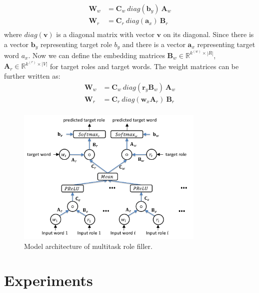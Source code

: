 \documentclass[a4paper]{article}
\begin{document}
\begin{equation} \label{eq:cls}
\begin{aligned}
    \mathbf{W}_w
        &= \mathbf{C}_w \ diag(\mathbf{b}_y) \ \mathbf{A}_w \\
    \mathbf{W}_r
        &= \mathbf{C}_r \ diag(\mathbf{a}_x) \ \mathbf{B}_r \\
\end{aligned}
\end{equation}
where $diag(\mathbf{v})$ is a diagonal matrix with vector $\mathbf{v}$ on its diagonal. Since there is a vector $\mathbf{b}_y$ representing target role $b_y$ and there is a vector $\mathbf{a}_x$ representing target word $a_x$. Now we can define the embedding matrices $\mathbf{B}_w \in \mathbb{R}^{k^{(w)} \times |R|}$, $\mathbf{A}_r \in \mathbb{R}^{k^{(r)} \times |V|}$ for target roles and target words. The weight matrices can be further written as: 
\begin{equation} \label{eq:cls_temb}
\begin{aligned}
    \mathbf{W}_w
        &= \mathbf{C}_w \ diag(\mathbf{r}_y \mathbf{B}_w) \ \mathbf{A}_w \\
    \mathbf{W}_r
        &= \mathbf{C}_r \ diag(\mathbf{w}_x \mathbf{A}_r) \ \mathbf{B}_r \\
\end{aligned}
\end{equation}



\begin{figure}[t]
\centering
\includegraphics[width=0.8\textwidth]{BOP.png}
\caption{\label{fig:BOP} Model architecture of multitask role filler.}
\end{figure}



\section{Experiments}
\end{document}
